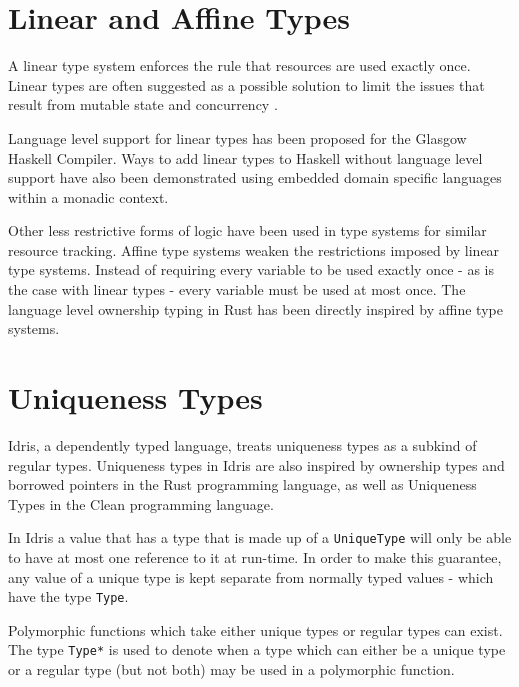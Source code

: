 \documentclass[onehalf,11pt]{beavtex}
\begin{document}
\section{Linear and Affine Types}

A linear type system enforces the rule that resources are used exactly once.
Linear types are often suggested as a possible solution to limit the issues that
result from mutable state \cite{Wadler90lineartypes} and concurrency
\cite{caires2010session}.

Language level support for linear types has been proposed for the Glasgow
Haskell Compiler. \cite{LinearTypesGHC}
Ways to add linear types to Haskell without language level support have also
been demonstrated using embedded domain specific languages within a monadic
context. \cite{Paykin:2017:LM:3122955.3122965}

Other less restrictive forms of logic have been used in type systems for similar
resource tracking.
Affine type systems weaken the restrictions imposed by linear type systems.
Instead of requiring every variable to be used exactly once - as is the case
with linear types - every variable must be used at most once.
The language level ownership typing in Rust has been directly inspired by affine
type systems.


\section{Uniqueness Types}

Idris, a dependently typed language, treats uniqueness types as a subkind of
regular types. Uniqueness types in Idris are also inspired by ownership types
and borrowed pointers in the Rust programming language, as well as Uniqueness
Types in the Clean programming language. %

In Idris a value that has a type that is made up of a \texttt{UniqueType}
will only be able to have at most one reference to it at run-time.
In order to make this guarantee, any value of a unique type is kept separate
from normally typed values - which have the type \texttt{Type}.

Polymorphic functions which take either unique types or regular
types can exist.
The type \texttt{Type*} is used to denote when a type which can either be a
unique type or a regular type (but not both) may be used in a polymorphic
function.
\end{document}

